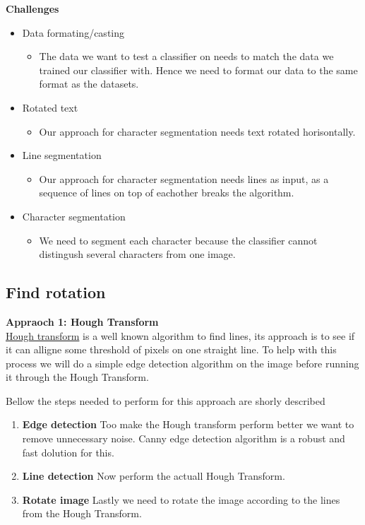 \documentclass[11pt,a4paper,UKenglish]{report}
\begin{document}
\begin{flushleft}
  \textbf{Challenges}
  \begin{itemize}
    \item{Data formating/casting}
    \begin{itemize}
      \item{The data we want to test a classifier on needs to match the data we trained our classifier with. Hence we need to format our data to the same format as the datasets.}
    \end{itemize}
    \item{Rotated text}
    \begin{itemize}
      \item{Our approach for character segmentation needs text rotated horisontally.}
    \end{itemize}
      \item{Line segmentation}
    \begin{itemize}
      \item{Our approach for character segmentation needs lines as input, as a sequence of lines on top of eachother breaks the algorithm.}
    \end{itemize}
      \item{Character segmentation}
    \begin{itemize}
      \item{We need to segment each character because the classifier cannot distingush several characters from one image.}
    \end{itemize}
  \end{itemize}
\end{flushleft}


\subsection{Find rotation}
\begin{flushleft}
  \textbf{Appraoch 1: Hough Transform} \\
  \href{https://en.wikipedia.org/wiki/Hough_transform}{Hough transform} is a
  well known algorithm to find lines, its approach is to see if it can
  alligne some threshold of pixels on one straight line. To help with this
  process we will do a simple edge detection algorithm on the image before
  running it through the Hough Transform. \par
  Bellow the steps needed to perform for this approach are shorly described

  \begin{enumerate}
    \item \textbf{Edge detection}
    Too make the Hough transform perform better we want to remove unnecessary
    noise. Canny edge detection algorithm is a robust and fast dolution for
    this.
    \item \textbf{Line detection}
    Now perform the actuall Hough Transform.
    \item \textbf{Rotate image}
    Lastly we need to rotate the image according to the lines from the Hough
    Transform.
  \end{enumerate}
\end{flushleft}
\end{document}
